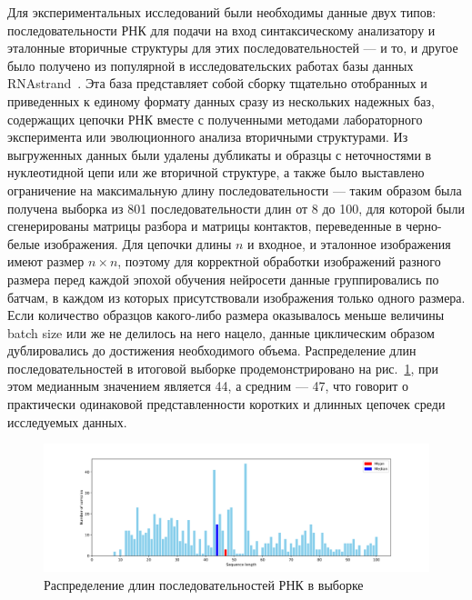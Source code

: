 Для экспериментальных исследований были необходимы данные двух типов: последовательности РНК для подачи на вход синтаксическому анализатору и эталонные вторичные структуры для этих последовательностей --- и то, и другое было получено из популярной в исследовательских работах базы данных RNAstrand~\cite{andronescu2008rna}. Эта база представляет собой сборку тщательно отобранных и приведенных к единому формату данных сразу из нескольких надежных баз, содержащих цепочки РНК вместе с полученными методами лабораторного эксперимента или эволюционного анализа вторичными структурами. Из выгруженных данных были удалены дубликаты и образцы с неточностями в нуклеотидной цепи или же вторичной структуре, а также было выставлено ограничение на максимальную длину последовательности --- таким образом была получена выборка из 801 последовательности длин от 8 до 100, для которой были сгенерированы матрицы разбора и матрицы контактов, переведенные в черно-белые изображения. Для цепочки длины $n$ и входное, и эталонное изображения имеют размер $n \times n$, поэтому для корректной обработки изображений разного размера перед каждой эпохой обучения нейросети данные группировались по батчам, в каждом из которых присутствовали изображения только одного размера. Если количество образцов какого-либо размера оказывалось меньше величины batch size или же не делилось на него нацело, данные циклическим образом дублировались до достижения необходимого объема. Распределение длин последовательностей в итоговой выборке продемонстрировано на рис.~\ref{plot_distr}, при этом медианным значением является 44, а средним --- 47, что говорит о практически одинаковой представленности коротких и длинных цепочек среди исследуемых данных.

\begin{figure}[h]
\begin{center}
\centering
\includegraphics[width=14.5cm]{pics/plot_distr.png}
\caption{Распределение длин последовательностей РНК в выборке}
\label{plot_distr}
\end{center}
\end{figure} 

